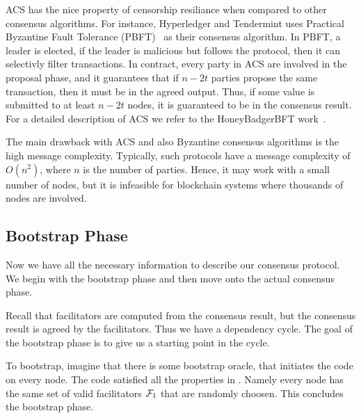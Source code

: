 ACS has the nice property of censorship resiliance when compared to other consensus algorithms.
For instance, Hyperledger and Tendermint uses Practical Byzantine Fault Tolerance (PBFT)~\cite{castro1999practical} as their consensus algorithm.
In PBFT, a leader is elected, if the leader is malicious but follows the protocol, then it can selectivly filter transactions.
In contract, every party in ACS are involved in the proposal phase,
and it guarantees that if $n - 2t$ parties propose the same transaction, then it must be in the agreed output.
Thus, if some value is submitted to at least $n - 2t$ nodes, it is guaranteed to be in the consensus result.
For a detailed description of ACS we refer to the HoneyBadgerBFT work~\cite{miller2016honey}.

The main drawback with ACS and also Byzantine consensus algorithms is the high message complexity.
Typically, such protocols have a message complexity of $O(n^2)$, where $n$ is the number of parties.
Hence, it may work with a small number of nodes,
but it is infeasible for blockchain systems where thousands of nodes are involved.




\subsection{Bootstrap Phase}
\label{sec:bootstrap}
Now we have all the necessary information to describe our consensus protocol.
We begin with the bootstrap phase and then move onto the actual consensus phase.

Recall that facilitators are computed from the consensus result,
but the consensus result is agreed by the facilitators.
Thus we have a dependency cycle.
The goal of the bootstrap phase is to give us a starting point in the cycle.

To bootstrap, imagine that there is some bootstrap oracle, that initiates the code on every node.
The code satisfied all the properties in .
Namely every node has the same set of valid facilitators $\mathcal{F}_1$ that are randomly choosen.
This concludes the bootstrap phase.

